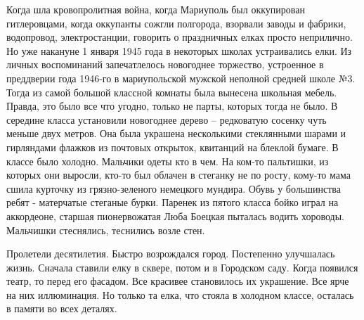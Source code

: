 
Когда шла кровопролитная война, когда Мариуполь был оккупирован гитлеровцами,
когда оккупанты сожгли полгорода, взорвали заводы и фабрики, водопровод,
электростанции, говорить о праздничных елках просто неприлично. Но уже накануне
1 января 1945 года в некоторых школах устраивались елки.  Из личных
воспоминаний запечатлелось новогоднее торжество, устроенное в преддверии года
1946-го в мариупольской мужской неполной средней школе №3. Тогда из самой
большой классной комнаты была вынесена школьная мебель. Правда, это было все
что угодно, только не парты, которых тогда не было. В середине класса
установили новогоднее дерево – редковатую сосенку чуть меньше  двух метров. Она
была  украшена несколькими  стеклянными  шарами и гирляндами  флажков из
почтовых открыток, квитанций на блеклой бумаге. В классе было холодно. Мальчики
одеты кто в чем. На ком-то пальтишки, из которых они выросли, кто-то был
облачен в стеганку не по росту, кому-то мама сшила курточку из грязно-зеленого
немецкого мундира. Обувь у большинства  ребят - матерчатые стеганые бурки.
Паренек из пятого класса бойко играл на аккордеоне, старшая пионервожатая Люба
Боецкая пыталась водить хороводы. Мальчишки стеснялись, теснились возле стен.

Пролетели десятилетия. Быстро возрождался город. Постепенно улучшалась жизнь.
Сначала ставили елку в сквере, потом и в Городском саду. Когда появился театр,
то перед его фасадом. Все красивее становилось их украшение. Все ярче  на них
иллюминация.  Но только та елка, что стояла в холодном классе, осталась в
памяти во всех деталях.
